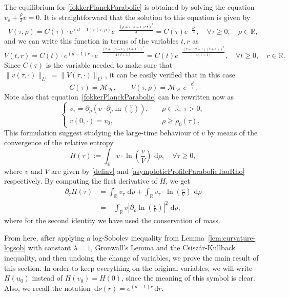 \documentclass[12pt,longbibliography]{article}
\newcommand{\abs}[1]{\left\vert#1\right\vert}
\def\R{\mathbb{R}}
\def\d{\,\mathrm{d}}
\def\R{\mathbb{R}}
\def\d{\,\mathrm{d}}
\theoremstyle{definition}
\theoremstyle{remark}
\theoremstyle{example}
\begin{document}
 The equilibrium for \eqref{fokkerPlanckParabolic} is obtained by solving the equation $ v_\rho + \frac{\rho}{2} v =0$. It is straightforward that the solution to this equation is given by
\[
V(\tau, \rho) = C(\tau) \cdot e^{(d-1)r(\tau,\rho)} e^{-\frac{\left(\rho+2(d-1)e^{\frac{\tau}{2}}\right)^2}{4}} = C(\tau)e^{-\frac{\rho^2}{4}} , \quad \forall \tau \geq 0, \quad \rho \in \mathbb{R},
\]
and we can write this function in terms of the variables $t,r$ as
\begin{equation}\label{asymptoticProfileParabolicTauRho}
V(t,r) = C(t) \cdot  e^{(d-1)r} \cdot e^{-\frac{(r+(d-1)(t+1))^2}{4(t+1)}}= C(t)e^{-\frac{(r-(d-1)(t+1))^2}{4(t+1)}}, \quad \forall t \geq 0, \quad r \in \mathbb{R}.
\end{equation}
Since $C(\tau)$ is the variable needed to make sure that $\|v(\tau,\cdot)\|_{L^1}= \|V(\tau,\cdot)\|_{L^1}$, it can be easily verified that in this case
\[
C(\tau)= \mathcal{M}_{\mathcal{H}},\qquad V(\tau, \rho)= \mathcal{M}_{\mathcal{H}}\  e^{-\frac{\rho^2}{4}}.
\]
Note also that equation~\eqref{fokkerPlanckParabolic} can be rewritten now as
\[
\begin{cases}
	v_\tau = \partial_\rho \left( v\cdot\partial_\rho \ln\left(\frac{v}{V}\right) \right), \quad &\rho \in \mathbb{R},\ \tau>0,\\
	v(0,\cdot) = v_0, &\rho\geq \rho_0(\tau),
\end{cases}
\]
This formulation suggest studying the large-time behaviour of $v$ by means of the convergence of the relative entropy
\[
H(\tau) := \int_{\R} v \cdot \ln \left(\frac{v}{V}\right) \, \d \rho, \quad \forall \tau \geq 0, 
\] 
where $v$ and $V$ are given by \eqref{definv} and \eqref{asymptoticProfileParabolicTauRho} respectively. By computing the first derivative of $H$, we get
\[
\begin{split}
	\partial_\tau H (\tau) & = \int_{\R} v_\tau \, \d \rho + \int_{\R} v_\tau \cdot\ln\left(\frac{v}{V}\right) \, \d \rho \\
	& =  - \int_{\R} v \abs{\partial_\rho \ln \left(\frac{v}{V}\right)}^2 \, \d \rho,
\end{split}
\]
where for the second identity we have used the conservation of mass.

From here, after applying a log-Sobolev inequality from Lemma~\ref{lem:curvature-logsob} with constant $\lambda=1$, Gronwall's Lemma and the Csiszár-Kullback inequality, and then undoing the change of variables, we prove the main result of this section. In order to keep everything on the original variables, we will write $H(u_0)$ instead of $H(v_0)=H(0)$, since the meaning of this symbol is clear. Also, we recall the notation $\d \nu (r) = e^{(d-1)r} \d r$.
\end{document}
